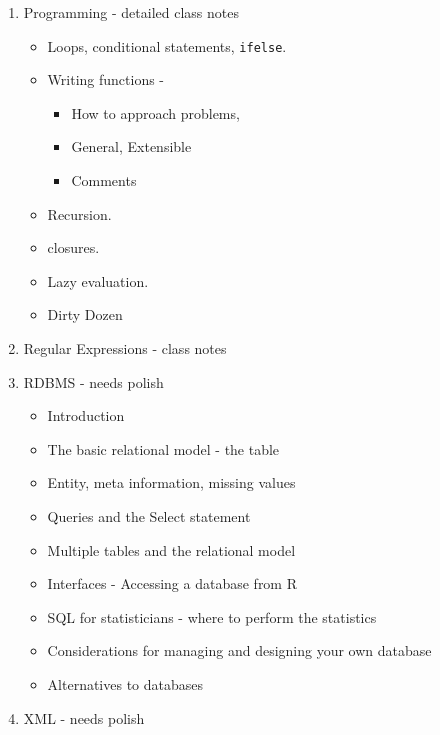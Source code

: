 \documentclass[11pt,timesroman]{article}
\begin{document}
\begin{enumerate}
\item{Programming - detailed class notes}
        \begin{itemize}
        \item Loops, conditional statements, \texttt{ifelse}.
        \item Writing functions - 
                \begin{itemize}
                \item How to approach problems,
                \item General, Extensible
                \item Comments
                \end{itemize}
        \item Recursion.
        \item closures.
        \item Lazy evaluation.
        \item Dirty Dozen
        \end{itemize}


\item{Regular Expressions - class notes} 

\item{RDBMS - needs polish}
        \begin{itemize}
        \item Introduction 
        \item The basic relational model - the table
        \item Entity, meta information, missing values
        \item Queries and the Select statement
        \item Multiple tables and the relational model
        \item Interfaces - Accessing a database from R 
        \item SQL for statisticians - where to perform the statistics
        \item Considerations for managing and designing your own database
        \item Alternatives to databases
        \end{itemize}


\item{XML - needs polish}


\end{enumerate}
\end{document}
